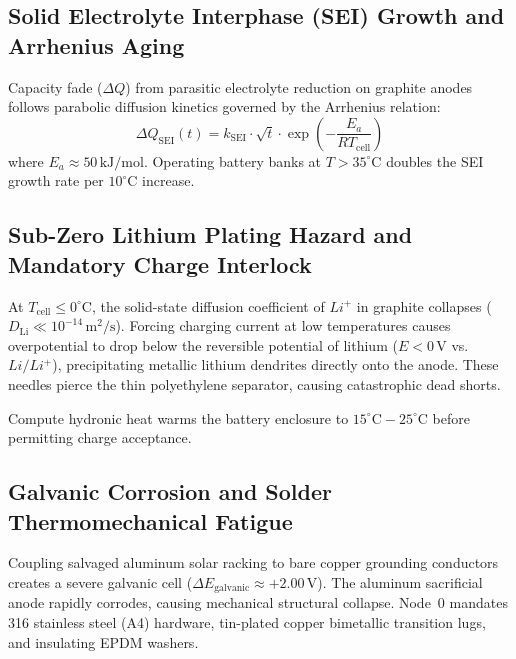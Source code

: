 \subsection{Solid Electrolyte Interphase (SEI) Growth and Arrhenius Aging}

Capacity fade ($\Delta Q$) from parasitic electrolyte reduction on graphite anodes follows parabolic diffusion kinetics governed by the Arrhenius relation:
\begin{equation}
\Delta Q_{\mathrm{SEI}}(t) = k_{\mathrm{SEI}} \cdot \sqrt{t} \cdot \exp\left( - \frac{E_a}{R T_{\mathrm{cell}}} \right)
\label{eq:sei_growth}
\end{equation}
where $E_a \approx 50\,\mathrm{kJ/mol}$. Operating battery banks at $T > 35^\circ\mathrm{C}$ doubles the SEI growth rate per $10^\circ\mathrm{C}$ increase.

\subsection{Sub-Zero Lithium Plating Hazard and Mandatory Charge Interlock}

At $T_{\mathrm{cell}} \le 0^\circ\mathrm{C}$, the solid-state diffusion coefficient of $Li^+$ in graphite collapses ($D_{\mathrm{Li}} \ll 10^{-14}\,\mathrm{m^2/s}$). Forcing charging current at low temperatures causes overpotential to drop below the reversible potential of lithium ($E < 0\,\mathrm{V}$ vs. $Li/Li^+$), precipitating metallic lithium dendrites directly onto the anode. These needles pierce the thin polyethylene separator, causing catastrophic dead shorts.
\begin{center}
\end{center}
Compute hydronic heat warms the battery enclosure to $15^\circ\mathrm{C}-25^\circ\mathrm{C}$ before permitting charge acceptance.

\subsection{Galvanic Corrosion and Solder Thermomechanical Fatigue}

Coupling salvaged aluminum solar racking to bare copper grounding conductors creates a severe galvanic cell ($\Delta E_{\mathrm{galvanic}} \approx +2.00\,\mathrm{V}$). The aluminum sacrificial anode rapidly corrodes, causing mechanical structural collapse. Node~0 mandates 316 stainless steel (A4) hardware, tin-plated copper bimetallic transition lugs, and insulating EPDM washers.


